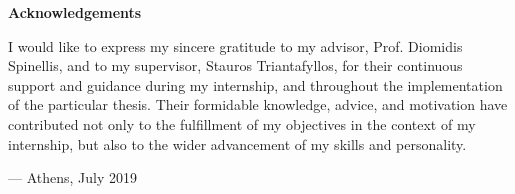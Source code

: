 \begin{center}
\textbf{\large Acknowledgements}
\end{center}

I would like to express my sincere gratitude
to my advisor, Prof. Diomidis Spinellis,
and to my supervisor, Stauros Triantafyllos,
for their continuous support and guidance
during my internship,
and throughout the implementation
of the particular thesis.
Their formidable knowledge, advice, and motivation
have contributed not only to the fulfillment
of my objectives in the context of my internship,
but also to the wider advancement of my skills and personality.

\vspace{1cm}

\hfill --- Athens, July 2019
